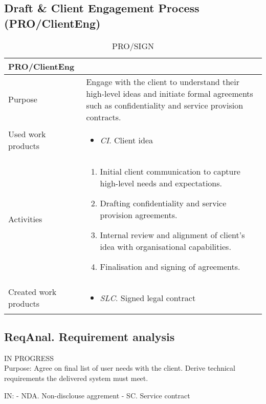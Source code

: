 \subsection{Draft \& Client Engagement Process (PRO/ClientEng)}
\begin{table}[h!]
\begin{tabular}{l|p{}}
\hline
\textbf{PRO/ClientEng}        & \textbf{} \\ \hline
Purpose &  Engage with the client to understand their high-level ideas and initiate formal agreements such as confidentiality and service provision contracts. \\ \hline
Used work products    &      
\begin{itemize}
    \item \textit{CI}. Client idea
\end{itemize}
\\ \hline
Activities            &   
\begin{enumerate}
     \item Initial client communication to capture high-level needs and expectations.
    \item Drafting confidentiality and service provision agreements.
    \item Internal review and alignment of client's idea with organisational capabilities.
    \item Finalisation and signing of agreements.
\end{enumerate}
\\ \hline
Created work products &     
\begin{itemize}
    \item \textit{SLC}. Signed legal contract 
\end{itemize}
\end{tabular}
\caption{PRO/SIGN}
\label{pro/sign}
\end{table}

\subsection{ReqAnal. Requirement analysis} %

IN PROGRESS \\

Purpose: Agree on final list of user needs with the client. Derive technical requirements the delivered system must meet.

IN: 
    - NDA. Non-disclouse aggrement
    - SC. Service contract %

